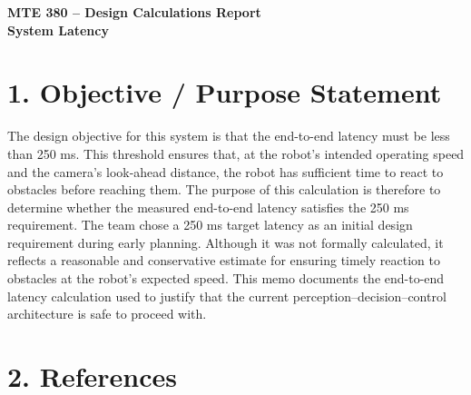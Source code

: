 \documentclass[11pt]{article}
\begin{document}
\begin{center}
    {\Large \textbf{MTE 380 – Design Calculations Report}}\\[0.5em]
    {\large \textbf{System Latency}}
\end{center}

\vspace{1em}

\section*{1. Objective / Purpose Statement}





The design objective for this system is that the end-to-end latency must be less than 
250 ms. This threshold ensures that, at the robot’s intended operating speed and the 
camera’s look-ahead distance, the robot has sufficient time to react to obstacles before 
reaching them. The purpose of this calculation is therefore to determine whether the 
measured end-to-end latency satisfies the 250 ms requirement.
The team chose a 250 ms target latency as an initial design requirement during early planning. Although it was not formally calculated, it reflects a reasonable and conservative estimate for ensuring timely reaction to obstacles at the robot’s expected speed.
This memo documents the end-to-end latency calculation used to justify that the current perception–decision–control architecture is safe to proceed with. 




\vspace{1em}

\section*{2. References}
\end{document}
